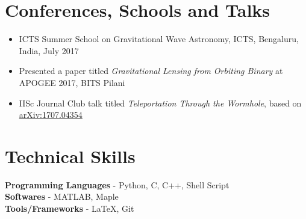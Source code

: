 \documentclass[margin, centered]{res}
\begin{document}
\begin{resume}
\section{Conferences, Schools and Talks}
\begin{itemize}[leftmargin=*]
 \item ICTS Summer School on Gravitational Wave Astronomy, ICTS, Bengaluru, India, July 2017
 \item Presented a paper titled \textit{Gravitational Lensing from Orbiting Binary} at APOGEE 2017, BITS Pilani
 \item IISc Journal Club talk titled \textit{Teleportation Through the Wormhole}, based on \href{https://arxiv.org/abs/1707.04354}{arXiv:1707.04354}
 \end{itemize}
\section{Technical \hspace{2mm} Skills}
\textbf{Programming Languages} - Python, C, C++, Shell Script\\
\textbf{Softwares} - MATLAB, Maple \\
\textbf{Tools/Frameworks} - \LaTeX, Git





\end{resume}
\end{document}
